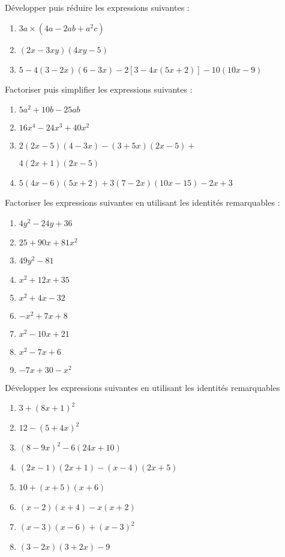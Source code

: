 


\begin{exercice}[]
Développer puis réduire les expressions suivantes :\\
\begin{enumerate}
\item $3a\times (4a-2ab+a^2c)$
\item $(2x-3xy)(4xy-5)$
\item $5-4(3-2x)(6-3x)-2[3-4x(5x+2)]

-10(10x-9)$
\end{enumerate}
\end{exercice}
\medskip
\begin{exercice}[]
Factoriser puis simplifier les expressions suivantes :\\
\begin{enumerate}
\item $5a^2+10b-25ab$
\item $16x^4-24x^3+40x^2$
\item $2(2x-5)(4-3x)-(3+5x)(2x-5)+$

$4(2x+1)(2x-5)$
\item $5(4x-6)(5x+2)+3(7-2x)(10x-15)-2x+3$
\end{enumerate}
\end{exercice}
\medskip
\begin{exercice}[]
Factoriser les expressions suivantes en utilisant les identités remarquables :\\
\begin{multicols}{2}
\begin{enumerate}
\item $4y^2-24y+36$
\item $25+90x+81x^2$
\item $49y^2-81$
\item $x^2+12x+35$
\item $x^2+4x-32$
\item $-x^2+7x+8$
\item $x^2-10x+21$
\item $x^2-7x+6$
\item $-7x+30-x^2$
\end{enumerate}
\end{multicols}
\end{exercice}
\medskip
\begin{exercice}[]
Développer les expressions suivantes en utilisant les identités remarquables\\
\begin{enumerate}
\item $3+(8x+1)^2$
\item $12-(5+4x)^2$
\item $(8-9x)^2-6(24x+10)$
\item $(2x-1)(2x+1)-(x-4)(2x+5)$
\item $10+(x+5)(x+6)$
\item $(x-2)(x+4)-x(x+2)$
\item $(x-3)(x-6)+(x-3)^2$
\item $(3-2x)(3+2x)-9$
\end{enumerate}
\end{exercice}
